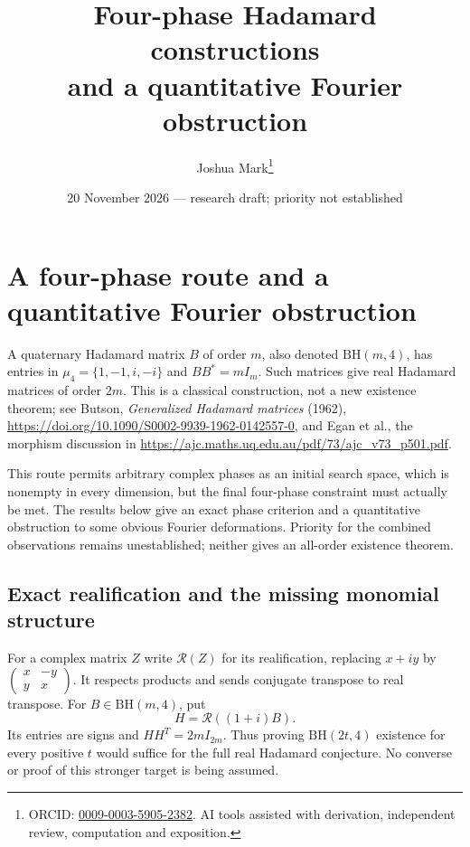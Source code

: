 \documentclass[11pt]{article}
\title{Four-phase Hadamard constructions\\and a quantitative Fourier obstruction}
\author{Joshua Mark\thanks{ORCID: \href{https://orcid.org/0009-0003-5905-2382}{0009-0003-5905-2382}. AI tools assisted with derivation, independent review, computation and exposition.}}
\date{20 November 2026 --- research draft; priority not established}
\begin{document}
\maketitle
\section{A four-phase route and a quantitative Fourier obstruction}
\label{sec:four-phase-route}

A quaternary Hadamard matrix $B$ of order $m$, also denoted
$\mathrm{BH}(m,4)$, has entries in $\mu_4=\{1,-1,i,-i\}$ and
$BB^*=mI_m$. Such matrices give real Hadamard matrices of order
$2m$. This is a classical construction, not a new existence theorem;
see Butson, \emph{Generalized Hadamard matrices} (1962),
\url{https://doi.org/10.1090/S0002-9939-1962-0142557-0},
and Egan et al., the morphism discussion in
\url{https://ajc.maths.uq.edu.au/pdf/73/ajc_v73_p501.pdf}.

This route permits arbitrary complex phases as an initial search
space, which is nonempty in every dimension, but the final four-phase
constraint must actually be met. The results below give an exact
phase criterion and a quantitative obstruction to some obvious
Fourier deformations. Priority for the combined observations remains
unestablished; neither gives an all-order existence theorem.

\subsection{Exact realification and the missing monomial structure}
For a complex matrix $Z$ write $\mathcal R(Z)$ for its realification,
replacing $x+iy$ by $\left(\begin{smallmatrix}x&-y\\y&x\end{smallmatrix}\right)$.
It respects products and sends conjugate transpose to real transpose.
For $B\in\mathrm{BH}(m,4)$, put
\[
                   H=\mathcal R((1+i)B).
\]
Its entries are signs and $HH^T=2mI_{2m}$. Thus proving
$\mathrm{BH}(2t,4)$ existence for every positive $t$ would suffice
for the full real Hadamard conjecture. No converse or proof of this
stronger target is being assumed.
\end{document}
